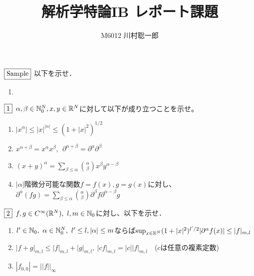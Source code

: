\documentclass[dvipdfmx, leqno]{jsreport}
\title{解析学特論IB レポート課題}
\author{M6012 川村聡一郎}
\date{}
\begin{document}
\maketitle
\begin{tcolorbox}$\fbox{Sample}$
    以下を示せ．
\begin{enumerate}
    \item 
\end{enumerate}
\end{tcolorbox}
\begin{tcolorbox}$\fbox{1}$
    $\alpha, \beta\in \mathbb{N}^N_0, x, y\in \mathbb{R}^N$に対して以下が成り立つことを示せ。
\begin{enumerate}
    \item $|x^\alpha|\le |x|^{|\alpha|}\le (1+ |x|^2)^{1/2}$
    \item $x^{\alpha+ \beta}= x^\alpha x^\beta,\ \ \partial^{\alpha+ \beta}= \partial^\alpha \partial^\beta$
    \item $(x+ y)^\alpha= \sum_{\beta\le \alpha}\binom{\alpha}{\beta} x^\beta y^{\alpha- \beta}$
    \item $|\alpha|$階微分可能な関数$f= f(x), g= g(x)$に対し、$\partial^\alpha(fg)= \sum_{\beta\le \alpha}\binom{\alpha}{\beta} \partial^\beta f \partial^{\alpha- \beta}g$
\end{enumerate}
\end{tcolorbox}
\begin{tcolorbox}$\fbox{2}$
    $f, g\in C^\infty(\mathbb{R}^N),\ l, m\in \mathbb{N}_0$に対し、以下を示せ．
\begin{enumerate}
    \item $l'\in \mathbb{N}_0,\ \alpha\in \mathbb{N}_0^N,\ l'\le l, |\alpha|\le m$ならば$\sup_{x\in \mathbb{R}^N} (1+|x|^2)^{{l'}/2}|\partial^\alpha f(x)|\le |f|_{m, l}$
    \item $|f+ g|_{m, l}\le |f|_{m, l}+ |g|_{m, l},\ |cf|_{m, l}= |c||f|_{m, l}$\ \ ($c$は任意の複素定数)
    \item $|f_{0, 0}|= ||f||_\infty$%
\end{enumerate}
\end{tcolorbox}
\end{document}
